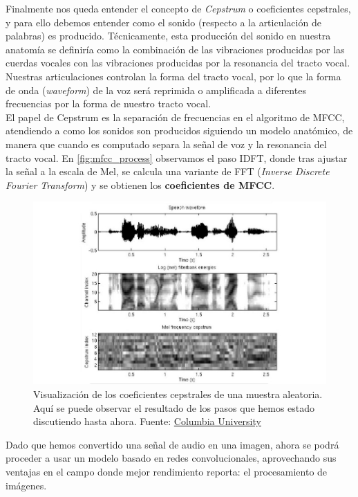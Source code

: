 \documentclass[11pt,a4paper,spanish]{book}
\begin{document}
	Finalmente nos queda entender el concepto de \emph{Cepstrum} o coeficientes cepstrales, y para ello debemos entender como el sonido (respecto a la articulación de palabras) es producido. Técnicamente, esta producción del sonido en nuestra anatomía se definiría como la combinación de las vibraciones producidas por las cuerdas vocales con las vibraciones producidas por la resonancia del tracto vocal. Nuestras articulaciones controlan la forma del tracto vocal, por lo que la forma de onda (\emph{waveform}) de la voz será reprimida o amplificada a diferentes frecuencias por la forma de nuestro tracto vocal.\\
	El papel de Cepstrum es la separación de frecuencias en el algoritmo de MFCC, atendiendo a como los sonidos son producidos siguiendo un modelo anatómico, de manera que cuando es computado separa la señal de voz y la resonancia del tracto vocal. En \ref{fig:mfcc_process} observamos el paso IDFT, donde tras ajustar la señal a la escala de Mel, se calcula una variante de FFT (\emph{Inverse Discrete Fourier Transform}) y se obtienen los \textbf{coeficientes de MFCC}.
	
	\begin{figure}[h]
		\centering
		\includegraphics[scale=0.3]{waveform_process.jpeg} 
		\caption{Visualización de los coeficientes cepstrales de una muestra aleatoria. Aquí se puede observar el resultado de los pasos que hemos estado discutiendo hasta ahora. Fuente: \href{https://www.ee.columbia.edu/~stanchen/spring16/e6870/slides/lecture3.pdf}{Columbia University}}
	\end{figure}

	Dado que hemos convertido una señal de audio en una imagen, ahora se podrá proceder a usar un modelo basado en redes convolucionales, aprovechando sus ventajas en el campo donde mejor rendimiento reporta: el procesamiento de imágenes.
	



	
	
		



	
	

	
	
	\printbibliography
	
\end{document}
